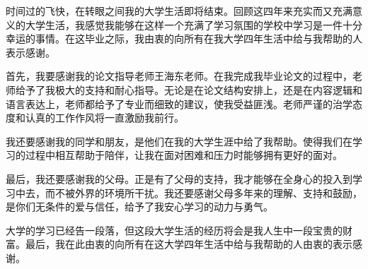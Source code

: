 \begin{acknowledgements} 
时间过的飞快，在转眼之间我的大学生活即将结束。回顾这四年来充实而又充满意义的大学生活，我感觉我能够在这样一个充满了学习氛围的学校中学习是一件十分幸运的事情。在这毕业之际，我由衷的向所有在我大学四年生活中给与我帮助的人表示感谢。

首先，我要感谢我的论文指导老师王海东老师。在我完成我毕业论文的过程中，老师给予了我极大的支持和耐心指导。无论是在论文结构安排上，还是在内容逻辑和语言表达上，老师都给予了专业而细致的建议，使我受益匪浅。老师严谨的治学态度和认真的工作作风将一直激励我前行。

我还要感谢我的同学和朋友，是他们在我的大学生涯中给了我帮助。使得我们在学习的过程中相互帮助于陪伴，让我在面对困难和压力时能够拥有更好的面对。

最后，我还要感谢我的父母。正是有了父母的支持，我才能够在全身心的投入到学习中去，而不被外界的环境所干扰。我还要感谢父母多年来的理解、支持和鼓励，是你们无条件的爱与信任，给予了我安心学习的动力与勇气。

大学的学习已经告一段落，但这段大学生活的经历将会是我人生中一段宝贵的财富。最后，我在此由衷的向所有在这大学四年生活中给与我帮助的人由衷的表示感谢。



\end{acknowledgements}
